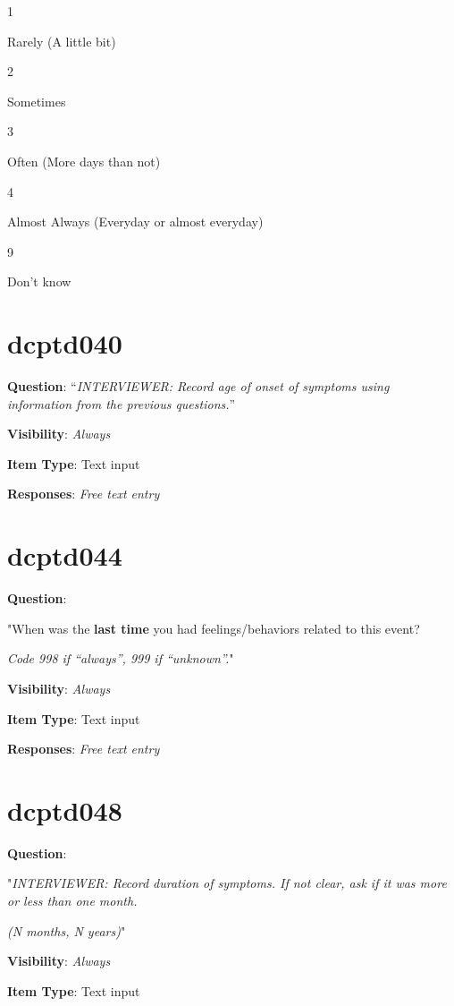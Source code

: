 \documentclass[]{book}
\begin{document}
1

Rarely (A little bit)

2

Sometimes

3

Often (More days than not)

4

Almost Always (Everyday or almost everyday)

9

Don't know

\hypertarget{dcptd040}{%
\section{dcptd040}\label{dcptd040}}

\textbf{Question}: ``\emph{INTERVIEWER: Record age of onset of symptoms using information from the previous questions.}''

\textbf{Visibility}: \emph{Always}

\textbf{Item Type}: Text input

\textbf{Responses}: \emph{Free text entry}

\hypertarget{dcptd044}{%
\section{dcptd044}\label{dcptd044}}

\textbf{Question}:

"When was the \textbf{last time} you had feelings/behaviors related to this event?

\emph{Code 998 if ``always'', 999 if ``unknown''.}"

\textbf{Visibility}: \emph{Always}

\textbf{Item Type}: Text input

\textbf{Responses}: \emph{Free text entry}

\hypertarget{dcptd048}{%
\section{dcptd048}\label{dcptd048}}

\textbf{Question}:

"\emph{INTERVIEWER: Record duration of symptoms. If not clear, ask if it was more or less than one month.}

\emph{(N months, N years)}"

\textbf{Visibility}: \emph{Always}

\textbf{Item Type}: Text input
\end{document}
